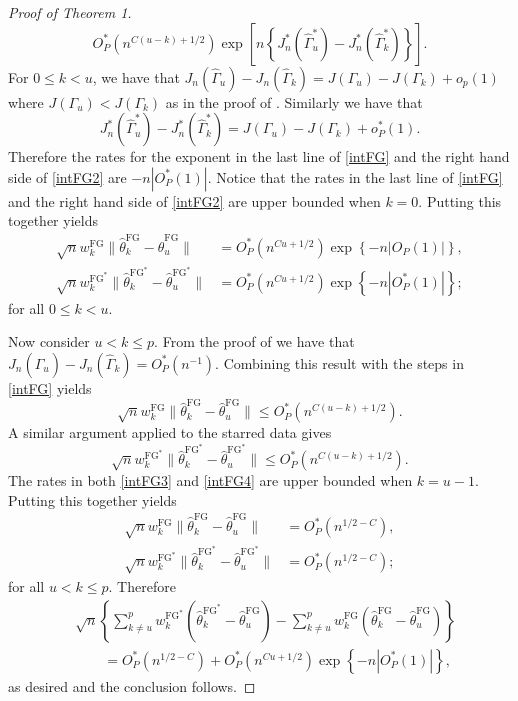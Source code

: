 \documentclass{article}\usepackage[]{graphicx}\usepackage[]{color}
\newcommand{\TFG}{\widehat{\theta}^{\text{FG}}}
\newcommand{\TstarFG}{\widehat{\theta}^{{\text{FG}}^{\textstyle{*}}}}
\newcommand{\Gamhat}{\widehat{\Gamma}}
\newcommand{\Gamstar}{\widehat{\Gamma}^{\textstyle{*}}}
\newcommand{\rootn}{\sqrt{n}}
\newcommand{\wFG}{w^{\text{FG}}}
\newcommand{\wstarFG}{w^{{\text{FG}}^{\textstyle{*}}}}
\newcommand{\Jstar}{J^{\textstyle{*}}}
\begin{document}
\begin{proof}[Proof of Theorem 1]
\begin{equation}
    O_P^{\textstyle{*}}\left(n^{C(u-k) + 1/2}\right)
      \exp\left[n\left\{\Jstar_n(\Gamstar_u) 
        - \Jstar_n(\Gamstar_k)\right\}\right].
\label{intFG2}
\end{equation}
For $0 \leq k < u$, we have that 
$
  J_n(\Gamhat_u) - J_n(\Gamhat_k) 
    = J(\Gamma_u) - J(\Gamma_k) + o_p(1)
$
where $J(\Gamma_u) < J(\Gamma_k)$ as in the proof of 
\citet[Theorem 3.1]{zhangmai}.  Similarly we have that 
$$
  \Jstar_n(\Gamstar_u) - \Jstar_n(\Gamstar_k) 
    = J(\Gamma_u) - J(\Gamma_k) + o_P^{\textstyle{*}}(1).
$$
Therefore the rates for the exponent in the last line of \eqref{intFG} and 
the right hand side of \eqref{intFG2} are $-n|O_P^{\textstyle{*}}(1)|$.  
Notice that the rates in the last line of \eqref{intFG} and the right hand 
side of \eqref{intFG2} are upper bounded when $k = 0$.  Putting this together 
yields 
\begin{align*}
  \rootn \wFG_k\|\TFG_k - \TFG_u\| 
    &= O_P^{\textstyle{*}}\left(n^{Cu + 1/2}\right)
      \exp\left\{-n|O_P(1)|\right\}, \\
  \rootn \wstarFG_k\|\TstarFG_k - \TstarFG_u\| 
    &= O_P^{\textstyle{*}}\left(n^{Cu + 1/2}\right)
      \exp\left\{-n|O_P^{\textstyle{*}}(1)|\right\};    
\end{align*}
for all $0 \leq k < u$. 

Now consider $u < k \leq p$. From the proof of \citet[Theorem 3.1]{zhangmai} 
we have that $J_n(\Gamhat_u) - J_n(\Gamhat_k) = O_P^{\textstyle{*}}(n^{-1})$. 
Combining this result with the steps in \eqref{intFG} yields 
\begin{equation}
  \rootn \wFG_k\|\TFG_k - \TFG_u\| \leq O_P^{\textstyle{*}}\left(n^{C(u-k) + 1/2}\right).
\label{intFG3}
\end{equation}
A similar argument applied to the starred data gives
\begin{equation}
  \rootn \wstarFG_k\|\TstarFG_k - \TstarFG_u\| 
    \leq O_P^{\textstyle{*}}\left(n^{C(u-k) + 1/2}\right). 
\label{intFG4}
\end{equation}
The rates in both \eqref{intFG3} and \eqref{intFG4} are upper bounded when 
$k = u - 1$.  Putting this together yields 
\begin{align*}
  \rootn \wFG_k\|\TFG_k - \TFG_u\| 
    &= O_P^{\textstyle{*}}\left(n^{1/2 - C}\right), \\
  \rootn \wstarFG_k\|\TstarFG_k - \TstarFG_u\| 
    &= O_P^{\textstyle{*}}\left(n^{1/2 - C}\right);    
\end{align*}
for all $u < k \leq p$. Therefore 
\begin{align*}
  &\rootn\left\{\sum_{k\neq u}^p\wstarFG_k\left(\TstarFG_k - \TFG_u\right) 
        - \sum_{k \neq u}^p \wFG_k\left(\TFG_k - \TFG_u\right)\right\} \\
  &\qquad= O_P^{\textstyle{*}}\left(n^{1/2 - C}\right) 
    + O_P^{\textstyle{*}}\left(n^{Cu + 1/2}\right)
    \exp\left\{-n|O_P^{\textstyle{*}}(1)|\right\},   
\end{align*}
as desired and the conclusion follows.
\end{proof}
\end{document}
